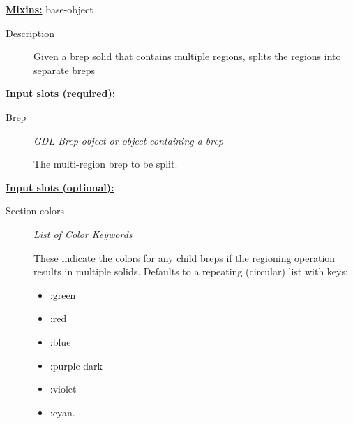 \documentclass [11pt]{book}
\begin{document}
\begin{itemize}
\textbf{
\underline{Mixins:}} base-object





\begin{description}

\item [
\underline{Description}]


Given a brep solid that contains multiple regions, splits the regions into separate breps



\end{description}








\textbf{
\underline{Input slots (required):}}

\begin{description}

\item [Brep]
\emph{GDL Brep object or object containing a brep}

 The multi-region brep to be split.




\end{description}






\textbf{
\underline{Input slots (optional):}}

\begin{description}

\item [Section-colors]
\emph{List of Color Keywords}

 These indicate the colors for any child breps if the regioning operation results in
multiple solids. Defaults to a repeating (circular) list with keys:


\begin{itemize}

\item  :green 

\item  :red 

\item  :blue 

\item  :purple-dark 

\item  :violet 

\item  :cyan. 


\end{itemize}
\end{description}
\end{itemize}
\end{document}
